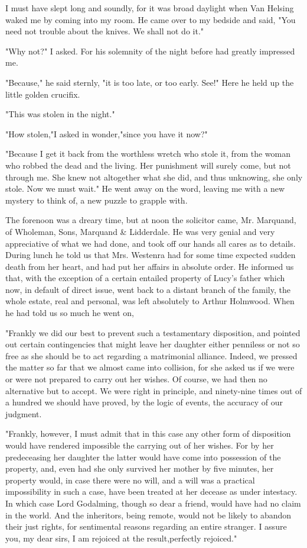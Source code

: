 I must have slept long and soundly, for it was broad daylight when Van Helsing waked me by coming into my room. He came over to my bedside and said, "You need not trouble about the knives. We shall not do it." 

"Why not?" I asked. For his solemnity of the night before had greatly impressed me. 

"Because," he said sternly, "it is too late, or too early. See!" Here he held up the little golden crucifix. 

"This was stolen in the night." 

"How stolen,"I asked in wonder,"since you have it now?" 

"Because I get it back from the worthless wretch who stole it, from the woman who robbed the dead and the living. Her punishment will surely come, but not through me. She knew not altogether what she did, and thus unknowing, she only stole. Now we must wait." He went away on the word, leaving me with a new mystery to think of, a new puzzle to grapple with. 

The forenoon was a dreary time, but at noon the solicitor came, Mr. Marquand, of Wholeman, Sons, Marquand & Lidderdale. He was very genial and very appreciative of what we had done, and took off our hands all cares as to details. During lunch he told us that Mrs. Westenra had for some time expected sudden death from her heart, and had put her affairs in absolute order. He informed us that, with the exception of a certain entailed property of Lucy's father which now, in default of direct issue, went back to a distant branch of the family, the whole estate, real and personal, was left absolutely to Arthur Holmwood. When he had told us so much he went on, 

"Frankly we did our best to prevent such a testamentary disposition, and pointed out certain contingencies that might leave her daughter either penniless or not so free as she should be to act regarding a matrimonial alliance. Indeed, we pressed the matter so far that we almost came into collision, for she asked us if we were or were not prepared to carry out her wishes. Of course, we had then no alternative but to accept. We were right in principle, and ninety-nine times out of a hundred we should have proved, by the logic of events, the accuracy of our judgment. 

"Frankly, however, I must admit that in this case any other form of disposition would have rendered impossible the carrying out of her wishes. For by her predeceasing her daughter the latter would have come into possession of the property, and, even had she only survived her mother by five minutes, her property would, in case there were no will, and a will was a practical impossibility in such a case, have been treated at her decease as under intestacy. In which case Lord Godalming, though so dear a friend, would have had no claim in the world. And the inheritors, being remote, would not be likely to abandon their just rights, for sentimental reasons regarding an entire stranger. I assure you, my dear sirs, I am rejoiced at the result,perfectly rejoiced." 

